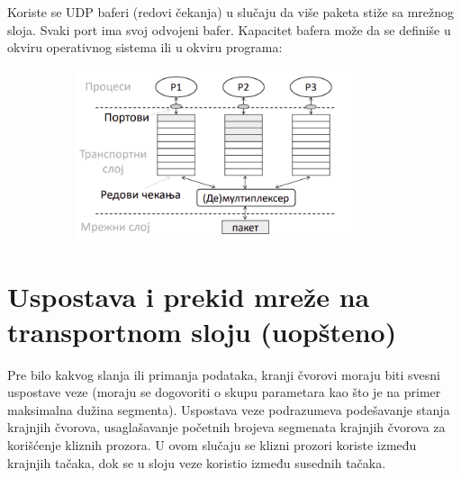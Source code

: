 \documentclass[a4paper]{article}
\begin{document}
    Koriste se UDP baferi (redovi čekanja) u slučaju da više paketa stiže sa mrežnog sloja. Svaki
    port ima svoj odvojeni bafer. Kapacitet bafera može da se definiše u okviru operativnog sistema
    ili u okviru programa:
    \begin{figure}[H]
        \begin{center}
            \includegraphics[width=100mm,height=50mm]{Slike/udp3.png}
        \end{center}
    \end{figure}

\section{Uspostava i prekid mreže na transportnom sloju (uopšteno)}
    Pre bilo kakvog slanja ili primanja podataka, kranji čvorovi moraju biti svesni uspostave 
    veze (moraju se dogovoriti o skupu parametara kao što je na primer maksimalna dužina segmenta).
    Uspostava veze podrazumeva podešavanje stanja krajnjih čvorova, usaglašavanje početnih
    brojeva segmenata krajnjih čvorova za korišćenje kliznih prozora. U ovom slučaju se
    klizni prozori koriste između krajnjih tačaka, dok se u sloju veze koristio između 
    susednih tačaka. 
\end{document}
